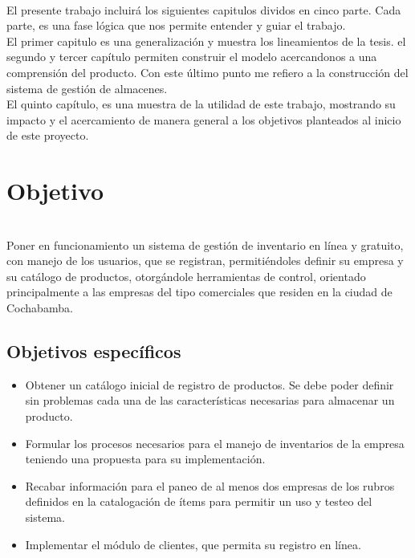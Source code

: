 \\
El presente trabajo incluirá los siguientes capitulos dividos en cinco parte. Cada parte, es una fase lógica que nos permite entender y guiar el trabajo.\\

El primer capitulo es una generalización y muestra los lineamientos de la tesis. el segundo y tercer capítulo permiten construir el modelo acercandonos a una comprensión del producto. Con este último punto me refiero a la construcción del sistema de gestión de almacenes.\\

El quinto capítulo, es una muestra de la utilidad de este trabajo, mostrando su impacto y el acercamiento de manera general a los objetivos planteados al inicio de este proyecto.\\


\section{Objetivo}

\\
Poner en funcionamiento un sistema de gestión de inventario en línea y gratuito, con manejo de los usuarios, que se registran, permitiéndoles definir su empresa y su catálogo de productos, otorgándole herramientas de control, orientado principalmente a las empresas del tipo comerciales que residen en la ciudad de Cochabamba.\\

\subsection{Objetivos específicos}

\begin{itemize}

\item Obtener un catálogo inicial de registro de productos. Se debe poder definir sin problemas cada una de las características necesarias para almacenar un producto.
\item Formular los procesos  necesarios para el manejo de inventarios de la empresa teniendo una propuesta para su implementación.
\item Recabar información para el paneo de al menos dos empresas de los rubros definidos en la catalogación de ítems para permitir un uso y testeo del sistema.
\item Implementar el módulo de clientes, que permita su registro en línea.

\end{itemize}


